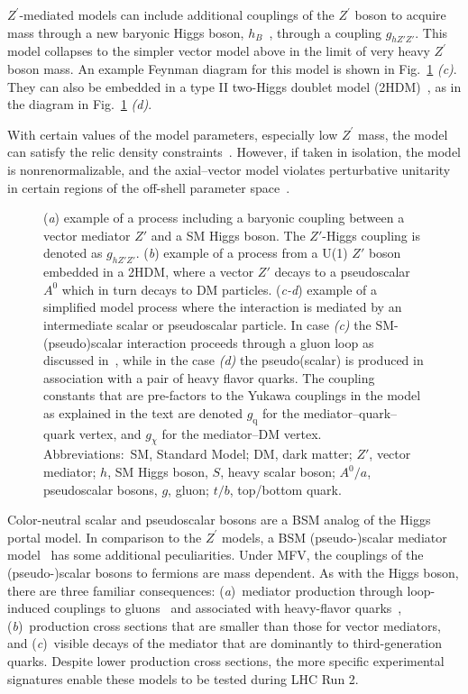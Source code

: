 \documentclass{ar-1col}
\newcommand{\chiDM}{\ensuremath{\chi}\xspace}
\newcommand{\gDM}{\ensuremath{g_{\chiDM}}\xspace}
\newcommand{\gdm}{\gDM}
\newcommand{\gq}{$g_{\mathrm{q}}$\xspace}
\newcommand{\ghZprimeZprime}{\ensuremath{g_{hZ'Z'}}\xspace}
\newcommand{\Zprime}{\ensuremath{{Z}^\prime}\xspace}
\begin{document}
\Zprime-mediated models can include additional couplings of the
\Zprime boson to acquire mass through a new baryonic Higgs boson,
$h_B$~\cite{Berlin:2014cfa}, through a coupling \ghZprimeZprime. 
This model collapses to the simpler vector model
above in the limit of very heavy \Zprime boson mass. 
An example Feynman diagram for this model is shown
in Fig.~\ref{fig:feynman_1} \textit{(c)}. 
They can also be
embedded in a type II two-Higgs doublet model
(2HDM)~\cite{Berlin:2014cfa}, as in the diagram in Fig.~\ref{fig:feynman_1} \textit{(d)}.

With certain values of the model parameters, especially low
\Zprime mass, the model can satisfy the relic density
constraints~\cite{Chala:2015ama}. However, if taken in isolation,
the model is nonrenormalizable, and the axial--vector model
violates perturbative unitarity in certain regions of the
off-shell parameter
space~\cite{Chala:2015ama,Kahlhoefer:2015bea,Boveia:2016mrp}.

\begin{figure}[!htpb]
\caption{
(\textit{a}) example of a process including a baryonic coupling between a vector mediator $Z'$ and a SM Higgs boson. The $Z'$-Higgs coupling is denoted as \ghZprimeZprime. 
(\textit{b}) example of a process from a U(1) $Z'$ boson embedded in a 2HDM, where a vector $Z'$ decays to a pseudoscalar $A^0$ which in turn decays to DM particles. 
(\textit{c-d}) example of a simplified model process where the interaction is mediated by an intermediate scalar or pseudoscalar particle. In case \textit{(c)} the SM-(pseudo)scalar interaction proceeds through a gluon loop as discussed in~\cite{Haisch:2013ata}, while in the case \textit{(d)} the pseudo(scalar) is produced in association with a pair of heavy flavor quarks. The coupling constants that are pre-factors to the Yukawa couplings in the model as explained in the text are denoted \gq for the mediator--quark--quark vertex, and \gdm for the mediator--DM vertex. 
Abbreviations:\ SM, Standard Model; DM, dark matter; $Z'$, vector mediator; $h$, SM Higgs boson, $S$, heavy scalar boson; $A^0/a$, pseudoscalar bosons, $g$, gluon; $t/b$, top/bottom quark. }
\label{fig:feynman_1}
\end{figure}

{Color-neutral scalar and pseudoscalar bosons} are a BSM
analog of the Higgs portal model. In comparison to the \Zprime
models, a BSM (pseudo-)scalar mediator
model~\cite{Buckley:2014fba} has some additional peculiarities.
Under MFV, the couplings of the (pseudo-)scalar bosons to fermions
are mass dependent. As with the Higgs boson, there are three
familiar consequences: (\textit{a})\ mediator production through loop-induced
couplings to gluons~\cite{Haisch:2015ioa} and associated with
heavy-flavor quarks~\cite{Buckley:2014fba}, (\textit{b})\ production
cross sections that are smaller than those for vector mediators, and (\textit{c})\ visible
decays of the mediator that are dominantly to third-generation quarks.
Despite lower production cross sections, the more specific
experimental signatures enable these models to be tested during
LHC Run 2.
\end{document}
